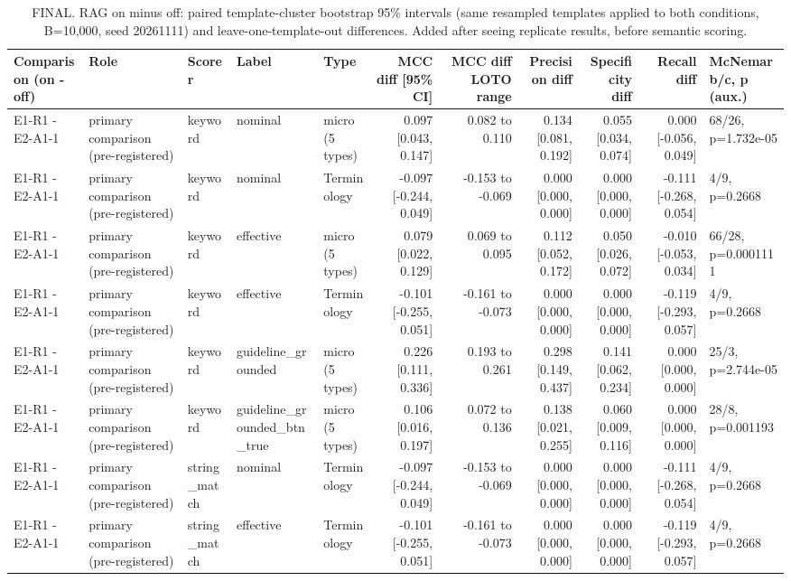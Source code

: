 \begin{table}[t]
\centering
\small
\caption{FINAL. RAG on minus off: paired template-cluster bootstrap 95\% intervals (same resampled templates applied to both conditions, B=10,000, seed 20261111) and leave-one-template-out differences. Added after seeing replicate results, before semantic scoring.}
\label{tab:e7-paired-cluster}
\begin{tabular}{lllllrrrrrl}
\toprule
Comparison (on - off) & Role & Scorer & Label & Type & MCC diff [95\% CI] & MCC diff LOTO range & Precision diff & Specificity diff & Recall diff & McNemar b/c, p (aux.) \\
\midrule
E1-R1 - E2-A1-1 & primary comparison (pre-registered) & keyword & nominal & micro (5 types) & 0.097 [0.043, 0.147] & 0.082 to 0.110 & 0.134 [0.081, 0.192] & 0.055 [0.034, 0.074] & 0.000 [-0.056, 0.049] & 68/26, p=1.732e-05 \\
E1-R1 - E2-A1-1 & primary comparison (pre-registered) & keyword & nominal & Terminology & -0.097 [-0.244, 0.049] & -0.153 to -0.069 & 0.000 [0.000, 0.000] & 0.000 [0.000, 0.000] & -0.111 [-0.268, 0.054] & 4/9, p=0.2668 \\
E1-R1 - E2-A1-1 & primary comparison (pre-registered) & keyword & effective & micro (5 types) & 0.079 [0.022, 0.129] & 0.069 to 0.095 & 0.112 [0.052, 0.172] & 0.050 [0.026, 0.072] & -0.010 [-0.053, 0.034] & 66/28, p=0.0001111 \\
E1-R1 - E2-A1-1 & primary comparison (pre-registered) & keyword & effective & Terminology & -0.101 [-0.255, 0.051] & -0.161 to -0.073 & 0.000 [0.000, 0.000] & 0.000 [0.000, 0.000] & -0.119 [-0.293, 0.057] & 4/9, p=0.2668 \\
E1-R1 - E2-A1-1 & primary comparison (pre-registered) & keyword & guideline\_grounded & micro (5 types) & 0.226 [0.111, 0.336] & 0.193 to 0.261 & 0.298 [0.149, 0.437] & 0.141 [0.062, 0.234] & 0.000 [0.000, 0.000] & 25/3, p=2.744e-05 \\
E1-R1 - E2-A1-1 & primary comparison (pre-registered) & keyword & guideline\_grounded\_btn\_true & micro (5 types) & 0.106 [0.016, 0.197] & 0.072 to 0.136 & 0.138 [0.021, 0.255] & 0.060 [0.009, 0.116] & 0.000 [0.000, 0.000] & 28/8, p=0.001193 \\
E1-R1 - E2-A1-1 & primary comparison (pre-registered) & string\_match & nominal & Terminology & -0.097 [-0.244, 0.049] & -0.153 to -0.069 & 0.000 [0.000, 0.000] & 0.000 [0.000, 0.000] & -0.111 [-0.268, 0.054] & 4/9, p=0.2668 \\
E1-R1 - E2-A1-1 & primary comparison (pre-registered) & string\_match & effective & Terminology & -0.101 [-0.255, 0.051] & -0.161 to -0.073 & 0.000 [0.000, 0.000] & 0.000 [0.000, 0.000] & -0.119 [-0.293, 0.057] & 4/9, p=0.2668 \\

\end{tabular}
\end{table}
